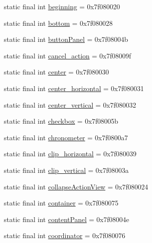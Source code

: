 \begin{CompactItemize}
static final int \hyperlink{classandroid_1_1support_1_1v4_1_1_r_1_1id_d9131d5f5b25bfbcb3ec121ee5d76007}{beginning} = 0x7f080020
\item 
static final int \hyperlink{classandroid_1_1support_1_1v4_1_1_r_1_1id_975c3da0e7ae537d3458c812ac5c3650}{bottom} = 0x7f080028
\item 
static final int \hyperlink{classandroid_1_1support_1_1v4_1_1_r_1_1id_a1eb6fbac226ebafed21169f3af4905f}{buttonPanel} = 0x7f08004b
\item 
static final int \hyperlink{classandroid_1_1support_1_1v4_1_1_r_1_1id_deed6d97414292b88750e4e24b68d0f4}{cancel\_\-action} = 0x7f08009f
\item 
static final int \hyperlink{classandroid_1_1support_1_1v4_1_1_r_1_1id_d434f6d4b06768195f53763b03579da0}{center} = 0x7f080030
\item 
static final int \hyperlink{classandroid_1_1support_1_1v4_1_1_r_1_1id_ed66d72024f128b88784e81236fb3a2f}{center\_\-horizontal} = 0x7f080031
\item 
static final int \hyperlink{classandroid_1_1support_1_1v4_1_1_r_1_1id_d2fe9e9082f77755180666784d639fe5}{center\_\-vertical} = 0x7f080032
\item 
static final int \hyperlink{classandroid_1_1support_1_1v4_1_1_r_1_1id_e68c379fd3871b9ba51e3d37d276fe90}{checkbox} = 0x7f08005b
\item 
static final int \hyperlink{classandroid_1_1support_1_1v4_1_1_r_1_1id_3cd0c97ea0658750b6544196f6fb681b}{chronometer} = 0x7f0800a7
\item 
static final int \hyperlink{classandroid_1_1support_1_1v4_1_1_r_1_1id_62cc6e2a0b5e22f46bab64a3a16433b5}{clip\_\-horizontal} = 0x7f080039
\item 
static final int \hyperlink{classandroid_1_1support_1_1v4_1_1_r_1_1id_a19715dd1870db9bfbc0138828de4fa1}{clip\_\-vertical} = 0x7f08003a
\item 
static final int \hyperlink{classandroid_1_1support_1_1v4_1_1_r_1_1id_cb38e3be591c390a39ffdc2ce23d52b2}{collapseActionView} = 0x7f080024
\item 
static final int \hyperlink{classandroid_1_1support_1_1v4_1_1_r_1_1id_0b4b52ebbbb524debb8250981237ab72}{container} = 0x7f080075
\item 
static final int \hyperlink{classandroid_1_1support_1_1v4_1_1_r_1_1id_2e75dacb64c6aca2f249bca36e0eb39b}{contentPanel} = 0x7f08004e
\item 
static final int \hyperlink{classandroid_1_1support_1_1v4_1_1_r_1_1id_47e5643c045debf3fbc563f06d7b0c59}{coordinator} = 0x7f080076

\end{CompactItemize}
